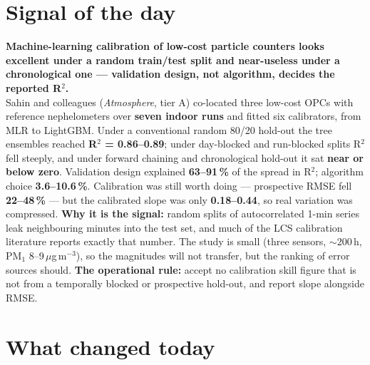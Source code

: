\documentclass[10pt]{article}
\begin{document}
\vspace{6mm}

\section*{\sffamily\bfseries\color{Deep}Signal of the day}
\vspace{-1.5mm}{\color{Amber}\rule{\linewidth}{1.1pt}}\vspace{2.5mm}

\begin{keybox}
{\sffamily\bfseries\small\color{Deep}Machine-learning calibration of low-cost particle
counters looks excellent under a random train/test split and near-useless under a chronological
one --- validation design, not algorithm, decides the reported R$^2$.}\\[1.4mm]
\footnotesize
Sahin and colleagues (\textit{Atmosphere}, tier A) co-located three low-cost OPCs with reference
nephelometers over \textbf{seven indoor runs} and fitted six calibrators, from MLR to LightGBM. Under a
conventional random 80/20 hold-out the tree ensembles reached \textbf{R$^2$ = 0.86--0.89}; under day-blocked
and run-blocked splits R$^2$ fell steeply, and under forward chaining and chronological hold-out it sat
\textbf{near or below zero}. Validation design explained \textbf{63--91\,\%} of the spread in R$^2$; algorithm
choice \textbf{3.6--10.6\,\%}. Calibration was still worth doing --- prospective RMSE fell \textbf{22--48\,\%} ---
but the calibrated slope was only \textbf{0.18--0.44}, so real variation was compressed.
\textbf{Why it is the signal:} random splits of autocorrelated 1-min series leak neighbouring
minutes into the test set, and much of the LCS calibration literature reports exactly that number.
The study is small (three sensors, $\sim$200\,h, PM$_1$ 8--9\,$\mu$g\,m$^{-3}$), so the magnitudes
will not transfer, but the ranking of error sources should. \textbf{The operational rule:} accept
no calibration skill figure that is not from a temporally blocked or prospective hold-out, and report
slope alongside RMSE.\par
\end{keybox}

\vspace{3mm}

\section*{\sffamily\bfseries\color{Deep}What changed today}
\vspace{-1.5mm}{\color{Amber}\rule{\linewidth}{1.1pt}}\vspace{2.5mm}
\end{document}

